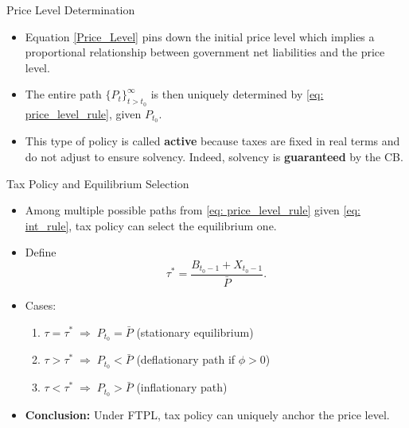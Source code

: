 \documentclass[11pt,aspectratio=169]{beamer}
\begin{document}
\begin{frame}{Price Level Determination}
\begin{itemize}
    \item Equation \eqref{Price_Level} pins down the initial price level which implies a proportional relationship between government net liabilities and the price level.
    \vspace{0.25cm}
    
    \item The entire path $\{P_t\}_{t>t_0}^\infty$ is then uniquely determined by \eqref{eq: price_level_rule}, given $P_{t_0}$.
    \vspace{0.5cm}
\item This type of policy is called \textbf{active} because taxes are fixed in real terms and do not adjust to ensure solvency. Indeed, solvency is \textbf{guaranteed} by the CB.
\end{itemize}

\end{frame}

\begin{frame}{Tax Policy and Equilibrium Selection}
\begin{itemize}
    \item Among multiple possible paths from \eqref{eq: price_level_rule} given \eqref{eq: int_rule}, tax policy can select the equilibrium one.
    \item Define
    \[
    \tau^* = \frac{B_{t_0-1} + X_{t_0-1}}{\bar P}.
    \]
    \item Cases:
    \begin{enumerate}
        \item $\tau = \tau^* \;\Rightarrow\; P_{t_0} = \bar P$ (stationary equilibrium)
        \item $\tau > \tau^* \;\Rightarrow\; P_{t_0} < \bar P$ (deflationary path if $\phi > 0$)
        \item $\tau < \tau^* \;\Rightarrow\; P_{t_0} > \bar P$ (inflationary path)
    \end{enumerate}
    \item \textbf{Conclusion:} Under FTPL, tax policy can uniquely anchor the price level.
\end{itemize}
\end{frame}
\end{document}
